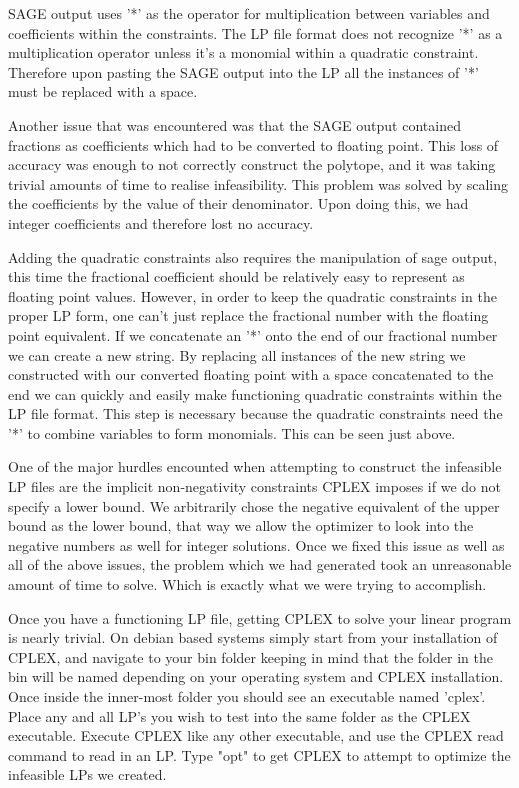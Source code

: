 \documentclass[11pt]{article} %
\theoremstyle{definition}
\theoremstyle{remark}
\begin{document}
SAGE output uses '*' as the operator for multiplication between variables and coefficients within the constraints. The LP file format does not recognize '*' as a multiplication operator unless it's a monomial within a quadratic constraint. Therefore upon pasting the SAGE output into the LP all the instances of '*' must be replaced with a space. 

Another issue that was encountered was that the SAGE output contained fractions as coefficients which had to be converted to floating point. This loss of accuracy was enough to not correctly construct the polytope, and it was taking trivial amounts of time to realise infeasibility. This problem was solved by scaling the coefficients by the value of their denominator. Upon doing this, we had integer coefficients and therefore lost no accuracy.

Adding the quadratic constraints also requires the manipulation of sage output, this time the fractional coefficient should be relatively easy to represent as floating point values. However, in order to keep the quadratic constraints in the proper LP form, one can't just replace the fractional number with the floating point equivalent. If we concatenate an '*' onto the end of our fractional number we can create a new string. By replacing all instances of the new string we constructed with our converted floating point with a space concatenated to the end we can quickly and easily make functioning quadratic constraints within the LP file format. This step is necessary because the quadratic constraints need the '*' to combine variables to form monomials. This can be seen just above. 

One of the major hurdles encounted when attempting to construct the infeasible LP files are the implicit non-negativity constraints CPLEX imposes if we do not specify a lower bound.
We arbitrarily chose the negative equivalent of the upper bound as the lower bound, that way we allow the optimizer to look into the negative numbers as well for integer solutions. Once we fixed this issue as well as all of the above issues, the problem which we had generated took an unreasonable amount of time to solve. Which is exactly what we were trying to accomplish.

Once you have a functioning LP file, getting CPLEX to solve your linear program is nearly trivial. On debian based systems simply start from your installation of CPLEX, and navigate to your bin folder keeping in mind that the folder in the bin will be named depending on your operating system and CPLEX installation. Once inside the inner-most folder you should see an executable named 'cplex'. Place any and all LP's you wish to test into the same folder as the CPLEX executable. Execute CPLEX like any other executable, and use the CPLEX read command to read in an LP. Type "opt" to get CPLEX to attempt to optimize the infeasible LPs we created. 
\end{document}
